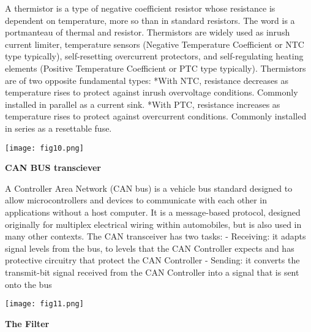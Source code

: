 \documentclass[11pt]{article}
\begin{document}
A thermistor is a type of negative coefficient resistor whose resistance is dependent on temperature, more so than in standard resistors. The word is a portmanteau of thermal and resistor. Thermistors are widely used as inrush current limiter, temperature sensors (Negative Temperature Coefficient or NTC type typically), self-resetting overcurrent protectors, and self-regulating heating elements (Positive Temperature Coefficient or PTC type typically).\newline
\newline
Thermistors are of two opposite fundamental types:\newline
*With NTC, resistance decreases as temperature rises to protect against inrush overvoltage \newline conditions. Commonly installed in parallel as a current sink.\newline
*With PTC, resistance increases as temperature rises to protect against overcurrent conditions. Commonly installed in series as a resettable fuse.\newline
\begin {center}
\texttt{[image: fig10.png]}\newline
\end{center}

\textbf{CAN BUS transciever}\newline

A Controller Area Network (CAN bus) is a vehicle bus standard designed to allow microcontrollers and devices to communicate with each other in applications without a host computer. It is a message-based protocol, designed originally for multiplex electrical wiring within automobiles, but is also used in many other contexts.\newline
The CAN transceiver has two tasks:\newline
- Receiving: it adapts signal levels from the bus, to levels that the CAN Controller expects and has protective circuitry that protect the CAN Controller\newline
- Sending: it converts the transmit-bit signal received from the CAN Controller into a signal that is sent onto the bus\newline
\begin {center}
\texttt{[image: fig11.png]}\newline
\end{center}

\textbf {The Filter}\newline
\end{document}

